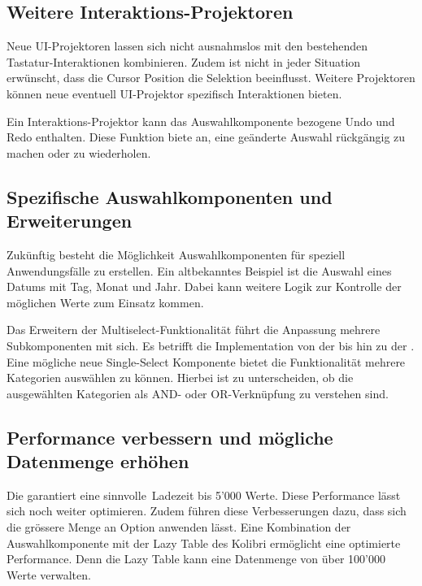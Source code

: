 \subsection{Weitere Interaktions-Projektoren}
\label{sec:moreInteraction}

Neue UI-Projektoren lassen sich nicht ausnahmslos mit den bestehenden Tastatur-Inter\-aktionen kombinieren. 
Zudem ist nicht in jeder Situation erwünscht, dass die Cursor Position die Selektion beeinflusst.
Weitere Projektoren können neue eventuell UI-Projektor spezifisch Interaktionen bieten.

Ein Interaktions-Projektor kann das Auswahlkomponente bezogene Undo und Redo enthalten.
Diese Funktion biete an, eine geänderte Auswahl rückgängig zu machen oder zu wiederholen.


\subsection{Spezifische Auswahlkomponenten und Erweiterungen}
\label{sec:specificComponents}

Zukünftig besteht die Möglichkeit Auswahlkomponenten für speziell Anwendungsfälle zu erstellen.
Ein altbekanntes Beispiel ist die Auswahl eines Datums mit Tag, Monat und Jahr.
Dabei kann weitere Logik zur Kontrolle der möglichen Werte zum Einsatz kommen.

Das Erweitern der Multiselect-Funktionalität führt die Anpassung mehrere Subkomponenten mit sich.
Es betrifft die Implementation von der  bis hin zu der .
Eine mögliche neue Single-Select Komponente bietet die Funktionalität mehrere Kategorien auswählen zu können.
Hierbei ist zu unterscheiden, ob die ausgewählten Kategorien als AND- oder OR-Verknüpfung zu verstehen sind.


\subsection{Performance verbessern und mögliche Datenmenge erhöhen}
\label{sec:betterPerformance}

Die  garantiert eine sinnvolle\footnotemark \ Ladezeit bis 5'000 Werte.
Diese Performance lässt sich noch weiter optimieren.
Zudem führen diese Verbesserungen dazu, dass sich die grössere Menge an Option anwenden lässt.
Eine Kombination der Auswahlkomponente mit der Lazy Table des Kolibri ermöglicht eine optimierte Performance.
Denn die Lazy Table kann eine Datenmenge von über 100'000 Werte verwalten.


